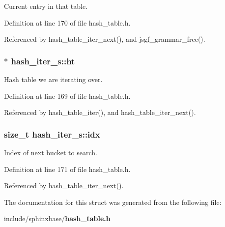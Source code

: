 \-Current entry in that table. 



\-Definition at line 170 of file hash\-\_\-table.\-h.



\-Referenced by hash\-\_\-table\-\_\-iter\-\_\-next(), and jsgf\-\_\-grammar\-\_\-free().

\subsubsection[{ht}]{$\ast$ {\bf hash\-\_\-iter\-\_\-s\-::ht}}\label{structhash__iter__s_a02844d3426aaa62e41086c98a052ed7d}


\-Hash table we are iterating over. 



\-Definition at line 169 of file hash\-\_\-table.\-h.



\-Referenced by hash\-\_\-table\-\_\-iter(), and hash\-\_\-table\-\_\-iter\-\_\-next().

\subsubsection[{idx}]{\setlength{\rightskip}{0pt plus 5cm}size\-\_\-t {\bf hash\-\_\-iter\-\_\-s\-::idx}}\label{structhash__iter__s_a9cb2842206d721ef3ef9b15c133ba3c9}


\-Index of next bucket to search. 



\-Definition at line 171 of file hash\-\_\-table.\-h.



\-Referenced by hash\-\_\-table\-\_\-iter\-\_\-next().



\-The documentation for this struct was generated from the following file\-:\begin{DoxyCompactItemize}
\item 
include/sphinxbase/{\bf hash\-\_\-table.\-h}\end{DoxyCompactItemize}
